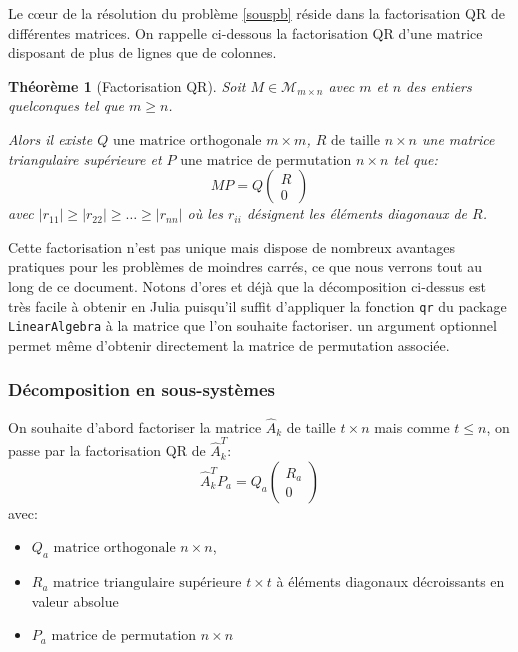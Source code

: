 \documentclass[a4paper,11pt]{article}
\newcommand{\ha}{\hat{A}}
\numberwithin{equation}{section}
\begin{document}
Le c\oe ur de la résolution du problème \eqref{souspb} réside dans la factorisation QR de différentes matrices.  On rappelle ci-dessous la factorisation QR d'une matrice disposant de plus de lignes que de colonnes.

\newtheorem*{theo}{Théorème}
\begin{theo}[Factorisation QR]
Soit $M \in \mathcal{M}_{m\times n}$ avec $m$ et $n$ des entiers quelconques tel que $m\geq n$.

Alors il existe $Q\text{ une matrice orthogonale } m\times m$, $ R \text{ de taille }n \times n$ une matrice triangulaire supérieure et $P \text{ une matrice de permutation } n\times n$ tel que:
\[
MP = Q 
\begin{pmatrix} 
R \\ 
0
\end{pmatrix}
\]
avec $|r_{11}| \geq |r_{22}| \geq \ldots \geq |r_{nn}|$ où les $r_{ii}$ désignent les éléments diagonaux de $R$. 
\end{theo}

Cette factorisation n'est pas unique mais dispose de nombreux avantages pratiques pour les problèmes de moindres carrés, ce que nous verrons tout au long de ce document. Notons d'ores et déjà que la décomposition ci-dessus est très facile à obtenir en Julia puisqu'il suffit d'appliquer la fonction \texttt{qr} du package \texttt{LinearAlgebra} à la matrice que l'on souhaite factoriser. un argument optionnel permet même d'obtenir directement la matrice de permutation associée.

\subsubsection{Décomposition en sous-systèmes}

On souhaite d'abord factoriser la matrice $\ha_{k}$ de taille $t \times n$ mais comme $t \leq n$, on passe par la factorisation QR de $\ha_{k}^{T}$:
\begin{equation} \label{qrAt}
\ha_{k}^{T}P_{a}=Q_{a}
\begin{pmatrix}
R_{a} \\
0
\end{pmatrix}
\end{equation}
avec: \begin{itemize}
\item
$Q_{a}\text{ matrice orthogonale } n\times n$, 
\item
$ R_{a} \text{ matrice triangulaire supérieure } t \times t$ à éléments diagonaux décroissants en valeur absolue
\item
$P_{a} \text{ matrice de permutation } n\times n$
\end{itemize}
\end{document}
